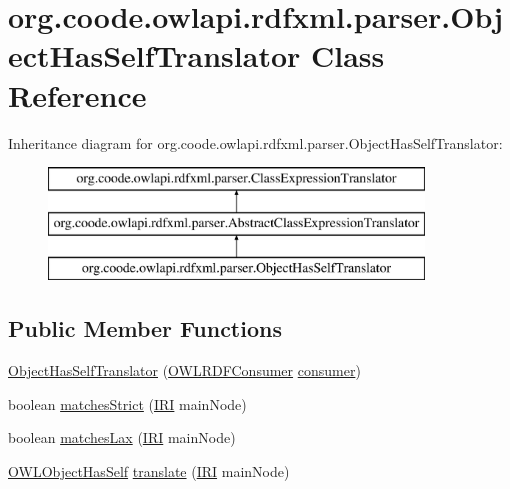 \hypertarget{classorg_1_1coode_1_1owlapi_1_1rdfxml_1_1parser_1_1_object_has_self_translator}{\section{org.\-coode.\-owlapi.\-rdfxml.\-parser.\-Object\-Has\-Self\-Translator Class Reference}
\label{classorg_1_1coode_1_1owlapi_1_1rdfxml_1_1parser_1_1_object_has_self_translator}
}
Inheritance diagram for org.\-coode.\-owlapi.\-rdfxml.\-parser.\-Object\-Has\-Self\-Translator\-:\begin{figure}[H]
\begin{center}
\leavevmode
\includegraphics[height=3.000000cm]{classorg_1_1coode_1_1owlapi_1_1rdfxml_1_1parser_1_1_object_has_self_translator}
\end{center}
\end{figure}
\subsection*{Public Member Functions}
\begin{DoxyCompactItemize}
\item 
\hyperlink{classorg_1_1coode_1_1owlapi_1_1rdfxml_1_1parser_1_1_object_has_self_translator_a7f6b403c147946cba9a4d089eae066c3}{Object\-Has\-Self\-Translator} (\hyperlink{classorg_1_1coode_1_1owlapi_1_1rdfxml_1_1parser_1_1_o_w_l_r_d_f_consumer}{O\-W\-L\-R\-D\-F\-Consumer} \hyperlink{classorg_1_1coode_1_1owlapi_1_1rdfxml_1_1parser_1_1_abstract_class_expression_translator_ae547084cdd5b92c03835b5aa404f823b}{consumer})
\item 
boolean \hyperlink{classorg_1_1coode_1_1owlapi_1_1rdfxml_1_1parser_1_1_object_has_self_translator_ad6f3f8368b9c495e032b432508696613}{matches\-Strict} (\hyperlink{classorg_1_1semanticweb_1_1owlapi_1_1model_1_1_i_r_i}{I\-R\-I} main\-Node)
\item 
boolean \hyperlink{classorg_1_1coode_1_1owlapi_1_1rdfxml_1_1parser_1_1_object_has_self_translator_a8999f14116aae614f161c332380f54e9}{matches\-Lax} (\hyperlink{classorg_1_1semanticweb_1_1owlapi_1_1model_1_1_i_r_i}{I\-R\-I} main\-Node)
\item 
\hyperlink{interfaceorg_1_1semanticweb_1_1owlapi_1_1model_1_1_o_w_l_object_has_self}{O\-W\-L\-Object\-Has\-Self} \hyperlink{classorg_1_1coode_1_1owlapi_1_1rdfxml_1_1parser_1_1_object_has_self_translator_ad7d77f96b70a9b234c2a487ca65d09fa}{translate} (\hyperlink{classorg_1_1semanticweb_1_1owlapi_1_1model_1_1_i_r_i}{I\-R\-I} main\-Node)
\end{DoxyCompactItemize}
